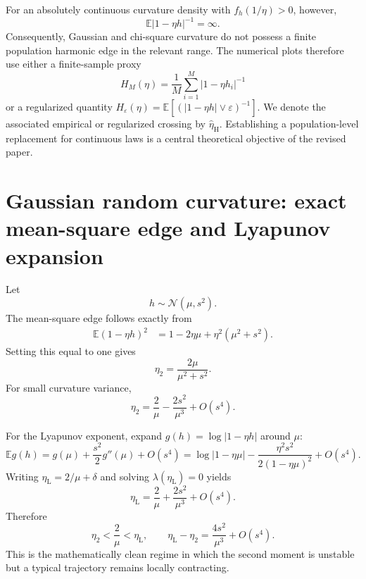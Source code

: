 \documentclass[11pt]{article}
\newcommand{\E}{\mathbb{E}}
\newcommand{\etal}{\eta_{\mathrm L}}
\newcommand{\etams}{\eta_{2}}
\begin{document}
For an absolutely continuous curvature density with $f_h(1/\eta)>0$, however,
\begin{equation}
    \E|1-\eta h|^{-1}=\infty.
\end{equation}
Consequently, Gaussian and chi-square curvature do not possess a finite population harmonic edge in the relevant range.  The numerical plots therefore use either a finite-sample proxy
\begin{equation}
    H_M(\eta)=\frac1M\sum_{i=1}^M|1-\eta h_i|^{-1}
\end{equation}
or a regularized quantity $H_\varepsilon(\eta)=\E[(|1-\eta h|\vee\varepsilon)^{-1}]$.  We denote the associated empirical or regularized crossing by $\widehat\eta_{\mathrm H}$.  Establishing a population-level replacement for continuous laws is a central theoretical objective of the revised paper.

\section{Gaussian random curvature: exact mean-square edge and Lyapunov expansion}

Let
\begin{equation}
    h\sim\mathcal N(\mu,s^2).
\end{equation}
The mean-square edge follows exactly from
\begin{align}
 \E(1-\eta h)^2
 &=1-2\eta\mu+\eta^2(\mu^2+s^2).
\end{align}
Setting this equal to one gives
\begin{equation}
    \boxed{\etams=\frac{2\mu}{\mu^2+s^2}}.
    \label{eq:msexact}
\end{equation}
For small curvature variance,
\begin{equation}
    \etams
    =\frac{2}{\mu}-\frac{2s^2}{\mu^3}+O(s^4).
    \label{eq:msexpand}
\end{equation}

For the Lyapunov exponent, expand $g(h)=\log|1-\eta h|$ around $\mu$:
\begin{equation}
 \E g(h)
 =g(\mu)+\frac{s^2}{2}g''(\mu)+O(s^4)
 =\log|1-\eta\mu|
 -\frac{\eta^2s^2}{2(1-\eta\mu)^2}+O(s^4).
 \label{eq:lyapexpand}
\end{equation}
Writing $\etal=2/\mu+\delta$ and solving $\lambda(\etal)=0$ yields
\begin{equation}
    \boxed{\etal=\frac{2}{\mu}+\frac{2s^2}{\mu^3}+O(s^4)}.
    \label{eq:lyapedgeapprox}
\end{equation}
Therefore
\begin{equation}
    \boxed{
    \etams<\frac{2}{\mu}<\etal,
    \qquad
    \etal-\etams=\frac{4s^2}{\mu^3}+O(s^4).}
    \label{eq:gap}
\end{equation}
This is the mathematically clean regime in which the second moment is unstable but a typical trajectory remains locally contracting.
\end{document}
